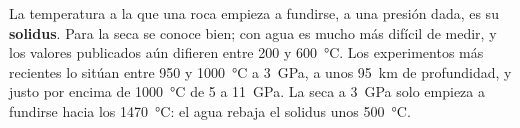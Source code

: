 La temperatura a la que una roca empieza a fundirse, a una presión dada, es su
\textbf{solidus}. Para la  seca se conoce bien; con agua es mucho
más difícil de medir, y los valores publicados aún difieren entre 200 y
\qty{600}{\celsius}. Los experimentos más recientes lo sitúan entre 950 y
\qty{1000}{\celsius} a \qty{3}{GPa}, a unos \qty{95}{km} de profundidad, y
justo por encima de \qty{1000}{\celsius} de 5 a \qty{11}{GPa}. La 
seca a \qty{3}{GPa} solo empieza a fundirse hacia los \qty{1470}{\celsius}:
el agua rebaja el solidus unos \qty{500}{\celsius}.

